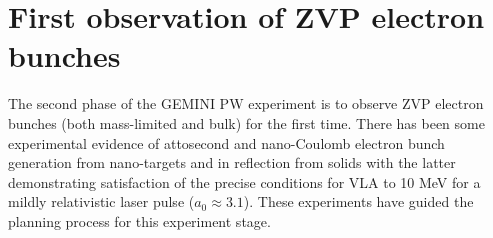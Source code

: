 
\section{First observation of ZVP electron bunches}
The second phase of the GEMINI PW experiment is to observe ZVP electron bunches (both mass-limited and bulk) for the first time. There has been some experimental evidence of attosecond and nano-Coulomb electron bunch generation from nano-targets \cite{cardenasSubcycleDynamicsRelativistic2019,hornyGenerationSingleAttosecond2021} and in reflection from solids \cite{linIsolatedAttosecondElectron2020, thevenetVacuumLaserAcceleration2016} with the latter demonstrating satisfaction of the precise conditions for \ac{VLA} to 10 MeV for a mildly relativistic laser pulse ($a_0 \approx 3.1$). These experiments have guided the planning process for this experiment stage.


